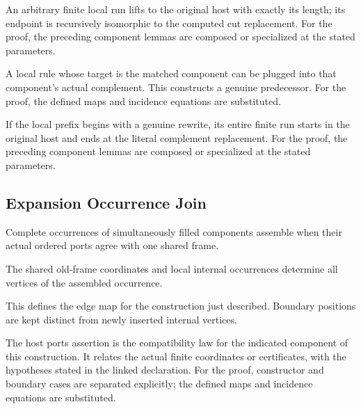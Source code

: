 An arbitrary finite local run lifts to the original host with exactly its length; its endpoint is recursively isomorphic to the computed cut replacement.
For the proof, the preceding component lemmas are composed or specialized at the stated parameters.
\par{}

A local rule whose target is the matched component can be plugged into that component's actual complement. This constructs a genuine predecessor.
For the proof, the defined maps and incidence equations are substituted.
\par{}

If the local prefix begins with a genuine rewrite, its entire finite run starts in the original host and ends at the literal complement replacement.
For the proof, the preceding component lemmas are composed or specialized at the stated parameters.
\par{}

\subsection{Expansion Occurrence Join}
Complete occurrences of simultaneously filled components assemble when their actual ordered ports agree with one shared frame.

The shared old-frame coordinates and local internal occurrences determine all vertices of the assembled occurrence.
\par{}

This defines the edge map for the construction just described. Boundary positions are kept distinct from newly inserted internal vertices.
\par{}

The host ports assertion is the compatibility law for the indicated component of this construction. It relates the actual finite coordinates or certificates, with the hypotheses stated in the linked declaration.
For the proof, constructor and boundary cases are separated explicitly; the defined maps and incidence equations are substituted.
\par{}

